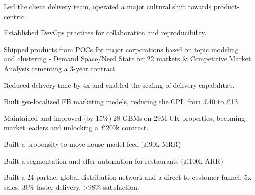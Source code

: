 \documentclass[a4paper]{deedy-resume} %
\begin{document}
\begin{minipage}[t]{0.66\textwidth}
Led the client delivery team, operated a major cultural shift towards product-centric.
\begin{tightitemize}
\item Established DevOps practices for collaboration and reproducibility.
\item Shipped products from POCs for major corporations based on topic modeling and clustering - Demand Space/Need State for 22 markets \& Competitive Market Analysis cementing a 3-year contract.
\item Reduced delivery time by 4x and enabled the scaling of delivery capabilities.
\end{tightitemize}
\sectionspace %



\begin{tightitemize}
\item Built geo-localized FB marketing models, reducing the CPL from £40 to £13.
\item Maintained and improved (by 15\%) 28 GBMs on 29M UK properties, becoming market leaders and unlocking a £200k contract.
\item Built a propensity to move house model feed (£90k MRR)
\item Built a segmentation and offer automation for restaurants (£100k ARR)
\end{tightitemize}

\sectionspace %


\begin{tightitemize}
\item Built a 24-partner global distribution network and a direct-to-customer funnel: 5x sales, 30\% faster delivery, >98\% satisfaction.
\end{tightitemize}


\end{minipage}
\end{document}
